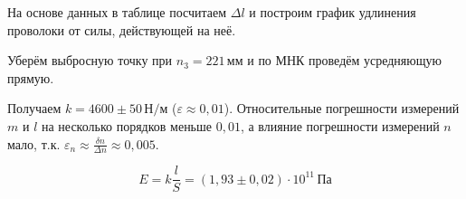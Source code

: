 На основе данных в таблице посчитаем $\Delta l$ и построим график удлинения проволоки
от силы, действующей на неё.

\begin{figure}[h!]
\end{figure}

Уберём выбросную точку при $n_3=221\,\text{мм}$ и по МНК проведём усредняющую прямую.
\begin{figure}[h!]
\end{figure}

Получаем $k=4600\pm 50\,\text{Н}/\text{м}$ ($\varepsilon\approx 0{,}01$).
Относительные погрешности измерений $m$ и $l$ на несколько порядков меньше $0{,}01$,
а влияние погрешности измерений $n$ мало, т.к. $\varepsilon_n\approx \frac{\delta n}{\Delta n}\approx 0{,}005$.

\[E=k\frac{l}{S}=\left(1{,}93\pm 0{,}02\right)\cdot 10^{11 }\,\text{Па}\]


